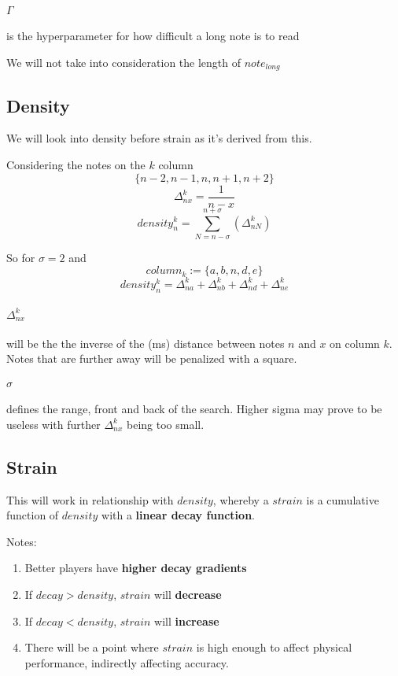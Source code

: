 \documentclass{article}
\begin{document}
\paragraph{$\Gamma$} is the hyperparameter for how difficult a long note is to read

We will not take into consideration the length of $note_{long}$

\subsection{Density}

We will look into density before strain as it's derived from this.

Considering the notes on the $k$ column
$$ \lbrace n-2, n-1, n, n+1, n+2 \rbrace $$
$$ \Delta_{nx}^k = \frac{1}{n - x}$$
$$ density_n^k =
\sum_{N=n-\sigma}^{n+\sigma}
\left(
\Delta_{nN}^k
\right)$$

So for $\sigma = 2$ and 
$$ column_k := \lbrace a, b, n, d, e\rbrace$$
$$ density_n^k = \Delta_{na}^k + \Delta_{nb}^k + \Delta_{nd}^k + \Delta_{ne}^k $$

\paragraph{$\Delta_{nx}^k$} will be the the inverse of the (ms) distance between notes $n$ and $x$ on column $k$. Notes that are further away will be penalized with a square. 

\paragraph{$\sigma$} defines the range, front and back of the search. Higher sigma may prove to be useless with further $\Delta_{nx}^k$ being too small.


\subsection{Strain}

This will work in relationship with $density$, whereby a $strain$ is a cumulative function of $density$ with a \textbf{linear decay function}.

Notes:
\begin{enumerate}
	\item Better players have \textbf{higher decay gradients}
	\item If $decay > density$, $strain$ will \textbf{decrease}
	\item If $decay < density$, $strain$ will \textbf{increase}
	\item There will be a point where $strain$ is high enough to affect physical performance, indirectly affecting accuracy.
\end{enumerate}
\end{document}
